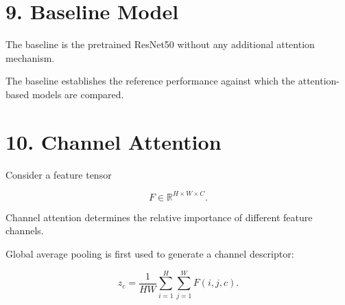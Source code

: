 \documentclass[10pt]{article}
\begin{document}
\section*{9. Baseline Model}

The baseline is the pretrained ResNet50 without any additional attention
mechanism.

\begin{center}


\end{center}

The baseline establishes the reference performance against which the
attention-based models are compared.

\section*{10. Channel Attention}

Consider a feature tensor

\[
F\in\mathbb{R}^{H\times W\times C}.
\]

Channel attention determines the relative importance of different feature
channels.

Global average pooling is first used to generate a channel descriptor:

\[
z_c
=
\frac{1}{HW}
\sum_{i=1}^{H}
\sum_{j=1}^{W}
F(i,j,c).
\]
\end{document}
